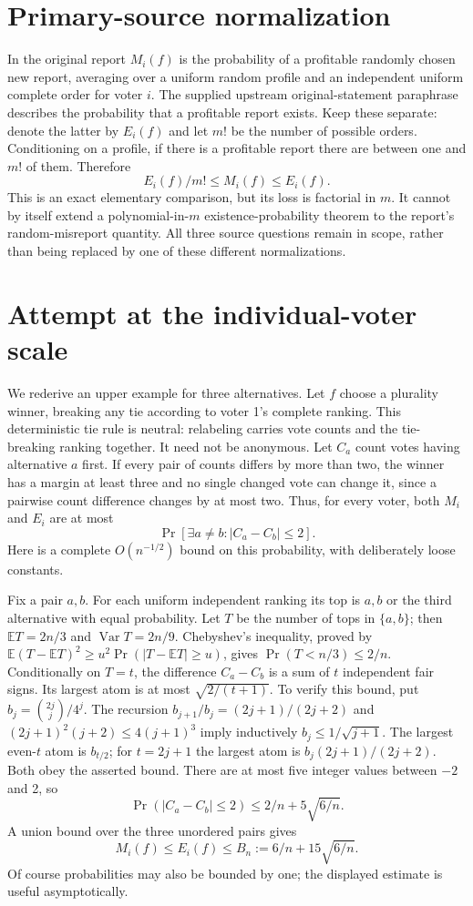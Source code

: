 \documentclass[11pt]{article}
\begin{document}
\section{Primary-source normalization}
In the original report $M_i(f)$ is the probability of a profitable randomly
chosen new report, averaging over a uniform random profile and an independent
uniform complete order for voter $i$. The supplied upstream original-statement
paraphrase describes the probability that a profitable report exists. Keep
these separate: denote the latter by $E_i(f)$ and let $m!$ be the number
of possible orders. Conditioning on a profile, if there is a profitable report
there are between one and $m!$ of them. Therefore
\[
E_i(f)/m!\le M_i(f)\le E_i(f).
\]
This is an exact elementary comparison, but its loss is factorial in $m$.
It cannot by itself extend a polynomial-in-$m$ existence-probability theorem
to the report's random-misreport quantity. All three source questions remain
in scope, rather than being replaced by one of these different normalizations.

\section{Attempt at the individual-voter scale}
We rederive an upper example for three alternatives. Let $f$ choose a
plurality winner, breaking any tie according to voter 1's complete ranking.
This deterministic tie rule is neutral: relabeling carries vote counts and
the tie-breaking ranking together. It need not be anonymous.
Let $C_a$ count votes having alternative $a$ first. If every pair of counts
differs by more than two, the winner has a margin at least three and no
single changed vote can change it, since a pairwise count difference changes
by at most two. Thus, for every voter, both $M_i$ and $E_i$ are at most
\[
\Pr[\exists a\ne b:|C_a-C_b|\le2].
\]
Here is a complete $O(n^{-1/2})$ bound on this probability, with deliberately
loose constants.

Fix a pair $a,b$. For each uniform independent ranking its top is $a,b$
or the third alternative with equal probability. Let $T$ be the number
of tops in $\{a,b\}$; then $\mathbb ET=2n/3$ and
$\operatorname{Var}T=2n/9$. Chebyshev's inequality, proved by
$\mathbb E(T-\mathbb ET)^2\ge u^2\Pr(|T-\mathbb ET|\ge u)$,
gives $\Pr(T<n/3)\le2/n$.
Conditionally on $T=t$, the difference $C_a-C_b$ is a sum of $t$
independent fair signs. Its largest atom is at most $\sqrt{2/(t+1)}$.
To verify this bound, put $b_j=\binom{2j}{j}/4^j$. The recursion
$b_{j+1}/b_j=(2j+1)/(2j+2)$ and
$(2j+1)^2(j+2)\le4(j+1)^3$ imply inductively
$b_j\le1/\sqrt{j+1}$. The largest even-$t$ atom is $b_{t/2}$;
for $t=2j+1$ the largest atom is $b_j(2j+1)/(2j+2)$.
Both obey the asserted bound. There are at most five integer values between
$-2$ and 2, so
\[
\Pr(|C_a-C_b|\le2)\le 2/n+5\sqrt{6/n}.
\]
A union bound over the three unordered pairs gives
\[
M_i(f)\le E_i(f)\le B_n:=6/n+15\sqrt{6/n}.
\]
Of course probabilities may also be bounded by one; the displayed estimate
is useful asymptotically.
\end{document}
